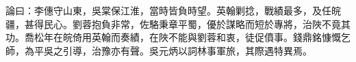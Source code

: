 \begin{pinyinscope}
論曰：李僡守山東，吳棠保江淮，當時皆負時望。英翰剿捻，戰績最多，及任皖疆，甚得民心。劉蓉抱負非常，佐駱秉章平蜀，優於謀略而短於專將，治陜不竟其功。喬松年在皖倚用英翰而奏績，在陜不能與劉蓉和衷，徒促僨事。錢鼎銘慷慨乞師，為平吳之引導，治豫亦有聲。吳元炳以詞林事軍旅，其際遇特異焉。


\end{pinyinscope}